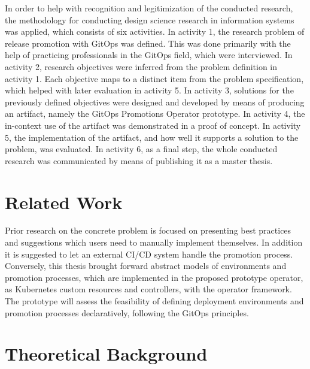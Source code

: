 In order to help with recognition and legitimization of the conducted research,
the methodology for conducting design science research in information systems
\autocite{designScienceResearchMethodologyForInformationSystemsResearch}
was applied, which consists of six activities.
In activity 1,
the research problem of
release promotion with GitOps
was defined.
This was done primarily with the help of practicing professionals in the GitOps field,
which were interviewed.
In activity 2,
research objectives were inferred from the problem definition in activity 1.
Each objective maps to a distinct item from the problem specification,
which helped with later evaluation in activity 5.
In activity 3,
solutions for the previously defined objectives were designed and developed
by means of producing an artifact, namely the GitOps Promotions Operator prototype.
In activity 4,
the in-context use of the artifact was demonstrated in a proof of concept.
In activity 5,
the implementation of the artifact,
and how well it supports a solution to the problem,
was evaluated.
In activity 6, as a final step,
the whole conducted research was communicated by means of
publishing it as a master thesis.

\section*{Related Work}

Prior research on the concrete problem is focused on presenting
best practices and suggestions
which users need to manually implement themselves.
In addition it is suggested to let an external CI/CD system handle the promotion process.
Conversely, this thesis brought forward
abstract models of environments and promotion processes,
which are implemented in the proposed prototype operator,
as Kubernetes custom resources and controllers, with the operator framework.
The prototype will assess the feasibility of
defining deployment environments and promotion processes declaratively,
following the GitOps principles.

\section*{Theoretical Background}

